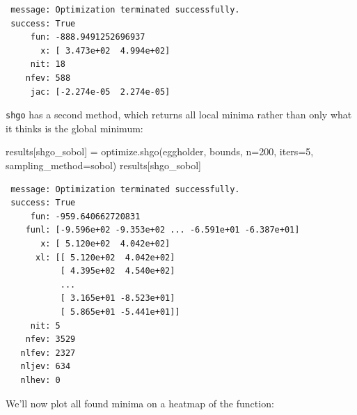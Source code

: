 \documentclass[
  letterpaper,
  DIV=11,
  numbers=noendperiod]{scrreprt}
\newenvironment{Shaded}{\begin{snugshade}}{\end{snugshade}}
\newcommand{\DecValTok}[1]{\textcolor[rgb]{0.68,0.00,0.00}{#1}}
\newcommand{\NormalTok}[1]{\textcolor[rgb]{0.00,0.23,0.31}{#1}}
\newcommand{\OperatorTok}[1]{\textcolor[rgb]{0.37,0.37,0.37}{#1}}
\newcommand{\StringTok}[1]{\textcolor[rgb]{0.13,0.47,0.30}{#1}}
\begin{document}
\begin{verbatim}
 message: Optimization terminated successfully.
 success: True
     fun: -888.9491252696937
       x: [ 3.473e+02  4.994e+02]
     nit: 18
    nfev: 588
     jac: [-2.274e-05  2.274e-05]
\end{verbatim}

\texttt{shgo} has a second method, which returns all local minima rather
than only what it thinks is the global minimum:

\begin{Shaded}
\begin{Highlighting}[]
\NormalTok{results[}\StringTok{\textquotesingle{}shgo\_sobol\textquotesingle{}}\NormalTok{] }\OperatorTok{=}\NormalTok{ optimize.shgo(eggholder, bounds, n}\OperatorTok{=}\DecValTok{200}\NormalTok{, iters}\OperatorTok{=}\DecValTok{5}\NormalTok{,}
\NormalTok{                                      sampling\_method}\OperatorTok{=}\StringTok{\textquotesingle{}sobol\textquotesingle{}}\NormalTok{)}
\NormalTok{results[}\StringTok{\textquotesingle{}shgo\_sobol\textquotesingle{}}\NormalTok{]}
\end{Highlighting}
\end{Shaded}

\begin{verbatim}
 message: Optimization terminated successfully.
 success: True
     fun: -959.640662720831
    funl: [-9.596e+02 -9.353e+02 ... -6.591e+01 -6.387e+01]
       x: [ 5.120e+02  4.042e+02]
      xl: [[ 5.120e+02  4.042e+02]
           [ 4.395e+02  4.540e+02]
           ...
           [ 3.165e+01 -8.523e+01]
           [ 5.865e+01 -5.441e+01]]
     nit: 5
    nfev: 3529
   nlfev: 2327
   nljev: 634
   nlhev: 0
\end{verbatim}

We'll now plot all found minima on a heatmap of the function:
\end{document}
